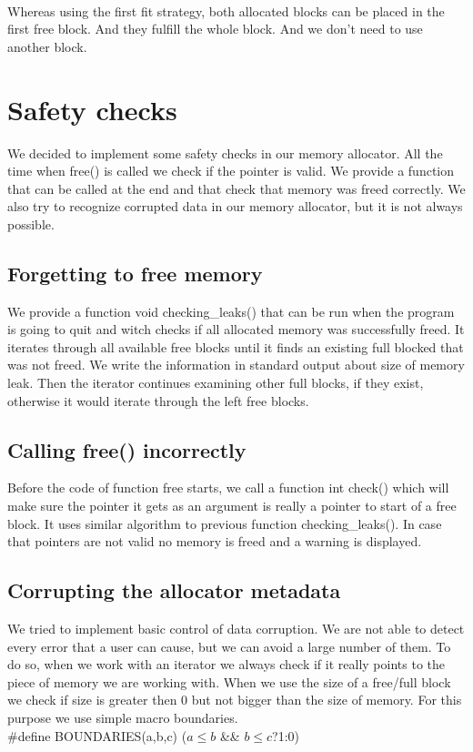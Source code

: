 \documentclass[a4paper,10pt]{article}
\begin{document}
\paragraph{}
Whereas using the first fit strategy, both allocated blocks can be placed
in the first free block. And they fulfill the whole block. And we don't need 
to use another block.
 
\section{Safety checks}
We decided to implement some safety checks in our memory allocator. All the time when free() is called we check if the pointer is valid. We provide a function that can be called at the end and that check that memory was freed correctly. We also try to recognize corrupted data in our memory allocator, but it is not always possible.

\subsection{Forgetting to free memory}
We provide a function void checking\_leaks() that can be run when the program is going to quit and witch checks if all allocated memory was successfully freed. It iterates through all available free blocks until it finds an existing full blocked that was not freed. We write the information in standard output about size of memory leak. Then the iterator continues examining other full blocks, if they exist, otherwise it would iterate through the left free blocks.

\subsection{Calling free() incorrectly}
Before the code of function free starts, we call a function int check() which will make sure the pointer it gets as an argument is really a pointer to start of a free block. It uses similar algorithm to previous function checking\_leaks(). In case that pointers are not valid no memory is freed and a warning is displayed.
\subsection{Corrupting the allocator metadata}
We tried to implement basic control of data corruption. We are not able to detect every error that a user can cause, but we can avoid a large number of them. To do so, when we work with an iterator we always check if it really points to the piece of memory we are working with. When we use the size of a free/full block we check if size is greater then 0 but not bigger than the size of memory. For this purpose we use simple macro boundaries.\\
\#define BOUNDARIES(a,b,c) ($a \leq b$ \&\& $b \leq c$?1:0)
\end{document}
